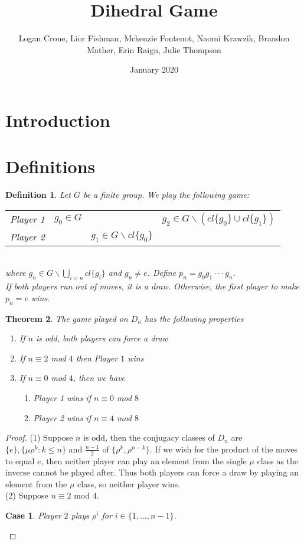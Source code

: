 \documentclass{amsart}
\title{Dihedral Game}
\author{Logan Crone, Lior Fishman, Mckenzie Fontenot, Naomi Krawzik, Brandon Mather, Erin Raign, Julie Thompson}
\date{January 2020}
\newtheorem{theorem}{Theorem}[section]
\newtheorem{definition}[theorem]{Definition}
\newtheorem{case}{Case}
\begin{document}
\maketitle

\section{Introduction}

\section{Definitions}

\begin{definition}
Let $G$ be a finite group. We play the following game: \medskip \\
 \begin{tabular}{c|ccc}
 \hline
  Player 1 & $g_0 \in G$ & & $g_2 \in G \backslash (cl\{g_0\} \cup cl\{g_1\})$ \\
  Player 2 & & $g_1 \in G \backslash cl\{g_0\}$ 
  \end{tabular} \medskip \\
   where $g_n \in G\backslash \bigcup_{i<n} cl\{g_i\}$ and $g_n \not = e$. Define $p_n = g_0 g_1 \cdot \cdot \cdot g_n$.\\
    If both players run out of moves, it is a draw. Otherwise, the first player to make $p_n = e$ wins.
\end{definition}

\begin{theorem}
The game played on $D_n$ has the following properties 
\begin{enumerate}
    \item If $n$ is odd, both players can force a draw
    \item If $n\equiv 2$ mod $4$ then Player $1$ wins
    \item If $n \equiv 0$ mod $4$, then we have
    \begin{enumerate}
     \item Player 1 wins if $n \equiv 0$ mod $8$
        \item Player 2 wins if $n \equiv 4$ mod $8$
     \end{enumerate}
\end{enumerate}
\end{theorem}

\begin{proof}
(1) Suppose $n$ is odd, then the conjugacy classes of $D_n$ are $\{e\}, \{\mu \rho^k:k\le n\}$ and $\frac{n-1}{2}$ of $\{\rho^k,\rho^{n-k}\}$.
If we wish for the product of the moves to equal $e$, then neither player can play an element from the single $\mu$ class as the inverse cannot be played after.
Thus both players can force a draw by playing an element from the $\mu$ class, so neither player wins.\\

(2) Suppose $n\equiv 2$ mod $4$.
\begin{case}
Player $2$ plays $\rho^i$ for $i \in \{1,...,n-1\}$.
\end{case}


\end{proof}
\end{document}
